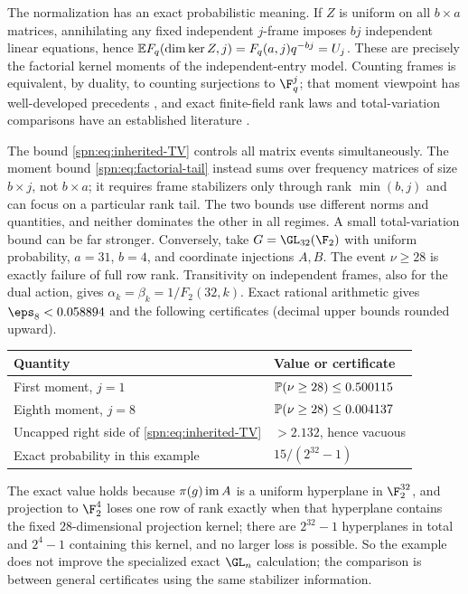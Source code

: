 The normalization has an exact probabilistic meaning. If $Z$ is uniform on all
$b\times a$ matrices, annihilating any fixed independent $j$-frame imposes
$bj$ independent linear equations, hence
$\mathbb{E} F_q(\dim\ker Z,j)=F_q(a,j)q^{-bj}=U_j$. These are precisely the
factorial kernel moments of the independent-entry model. Counting frames is
equivalent, by duality, to counting surjections to $\F_q^j$; that moment
viewpoint has well-developed precedents \cite{Wood2019Random}, and exact
finite-field rank laws and total-variation comparisons have an established
literature \cite{Fulman2015Stein}.

\begin{remark}\label{spn:rem:tv-vs-moments}
The bound \eqref{spn:eq:inherited-TV} controls all matrix events
simultaneously. The moment bound \eqref{spn:eq:factorial-tail} instead sums
over frequency matrices of size $b\times j$, not $b\times a$; it requires
frame stabilizers only through rank $\min(b,j)$ and can focus on a particular
rank tail. The two bounds use different norms and quantities, and neither
dominates the other in all regimes. A small total-variation bound can be far
stronger. Conversely, take $G=\GL_{32}(\F_2)$ with uniform probability,
$a=31$, $b=4$, and coordinate injections $A,B$. The event $\nu\ge28$ is
exactly failure of full row rank. Transitivity on independent frames, also
for the dual action, gives $\alpha_k=\beta_k=1/F_2(32,k)$. Exact rational
arithmetic gives $\eps_8<0.058894$ and the following certificates (decimal
upper bounds rounded upward).
\begin{center}
\begin{tabular}{ll}
\toprule
Quantity & Value or certificate\\
\midrule
First moment, $j=1$ & $\mathbb{P}(\nu\ge28)\le0.500115$\\
Eighth moment, $j=8$ & $\mathbb{P}(\nu\ge28)\le0.004137$\\
Uncapped right side of \eqref{spn:eq:inherited-TV} & $>2.132$, hence vacuous\\
Exact probability in this example & $15/(2^{32}-1)$\\
\bottomrule
\end{tabular}
\end{center}
The exact value holds because $\pi(g)\operatorname{im} A$ is a uniform hyperplane in
$\F_2^{32}$, and projection to $\F_2^4$ loses one row of rank exactly when
that hyperplane contains the fixed $28$-dimensional projection kernel; there
are $2^{32}-1$ hyperplanes in total and $2^4-1$ containing this kernel, and
no larger loss is possible. So the example does not improve the specialized
exact $\GL_n$ calculation; the comparison is between general certificates
using the same stabilizer information.
\end{remark}

